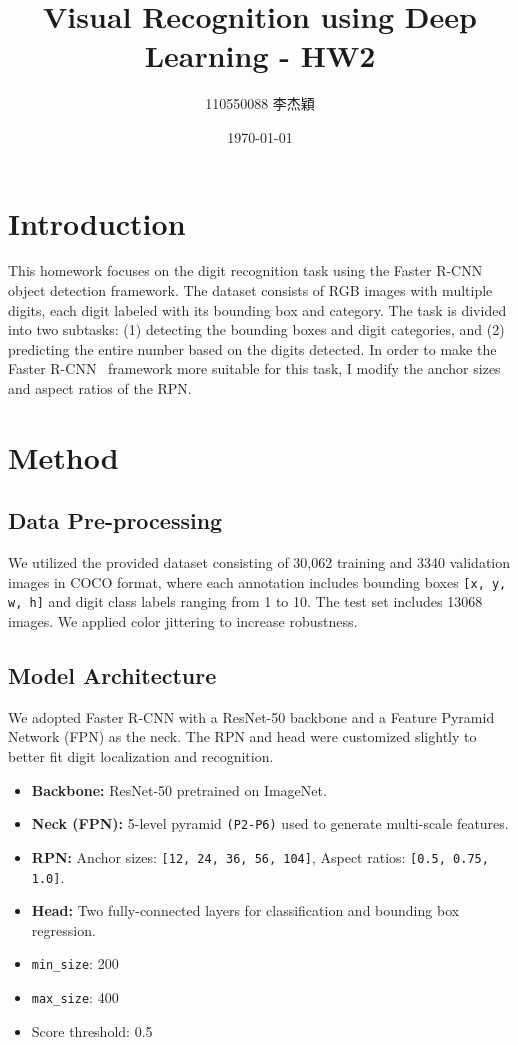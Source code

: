 \documentclass[twocolumn,a4paper]{article}
\title{Visual Recognition using Deep Learning - HW2}
\author{110550088 李杰穎}
\date{\today}
\begin{document}
\maketitle

\section{Introduction}
This homework focuses on the digit recognition task using the Faster R-CNN object detection framework. The dataset consists of RGB images with multiple digits, each digit labeled with its bounding box and category. The task is divided into two subtasks: (1) detecting the bounding boxes and digit categories, and (2) predicting the entire number based on the digits detected. In order to make the Faster R-CNN~\cite{ren2016faster} framework more suitable for this task, I modify the anchor sizes and aspect ratios of the RPN. 

\section{Method}

\subsection{Data Pre-processing}
We utilized the provided dataset consisting of 30,062 training and 3340 validation images in COCO format, where each annotation includes bounding boxes \texttt{[x, y, w, h]} and digit class labels ranging from 1 to 10. The test set includes 13068 images. We applied color jittering to increase robustness.

\subsection{Model Architecture}
We adopted Faster R-CNN with a ResNet-50 backbone and a Feature Pyramid Network (FPN) as the neck. The RPN and head were customized slightly to better fit digit localization and recognition.

\begin{itemize}
    \item \textbf{Backbone:} ResNet-50 pretrained on ImageNet.
    \item \textbf{Neck (FPN):} 5-level pyramid \texttt{(P2-P6)} used to generate multi-scale features.
    \item \textbf{RPN:} Anchor sizes: \texttt{[12, 24, 36, 56, 104]}, Aspect ratios: \texttt{[0.5, 0.75, 1.0]}.
    \item \textbf{Head:} Two fully-connected layers for classification and bounding box regression.
    \item \texttt{min\_size}: 200
    \item \texttt{max\_size}: 400
    \item Score threshold: 0.5
\end{itemize}
\end{document}
